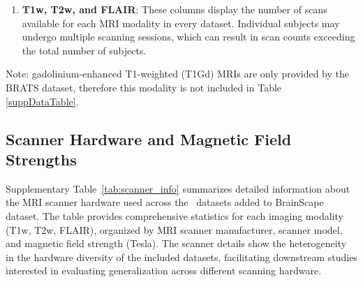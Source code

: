 \begin{enumerate}
    \item \textbf{T1w, T2w, and FLAIR}: These columns display the number of scans available for each MRI modality in every dataset. 
    Individual subjects may undergo multiple scanning sessions, which can result in scan counts exceeding the total number of subjects. 
\end{enumerate}

Note: gadolinium-enhanced T1-weighted (T1Gd) MRIs are only provided by the BRATS dataset, therefore this modality is not included in Table \ref{suppDataTable}.



\subsection{Scanner Hardware and Magnetic Field Strengths}

Supplementary Table~\ref{tab:scanner_info} summarizes detailed information about the MRI scanner hardware 
used across the \NumDatasets\ datasets added to BrainScape dataset. 
The table provides comprehensive statistics for each imaging modality (T1w, T2w, FLAIR), organized by MRI scanner manufacturer, 
scanner model, and magnetic field strength (Tesla). 
The scanner details show the heterogeneity in the hardware diversity of the included datasets, 
facilitating downstream studies interested in evaluating generalization across different scanning hardware. 

